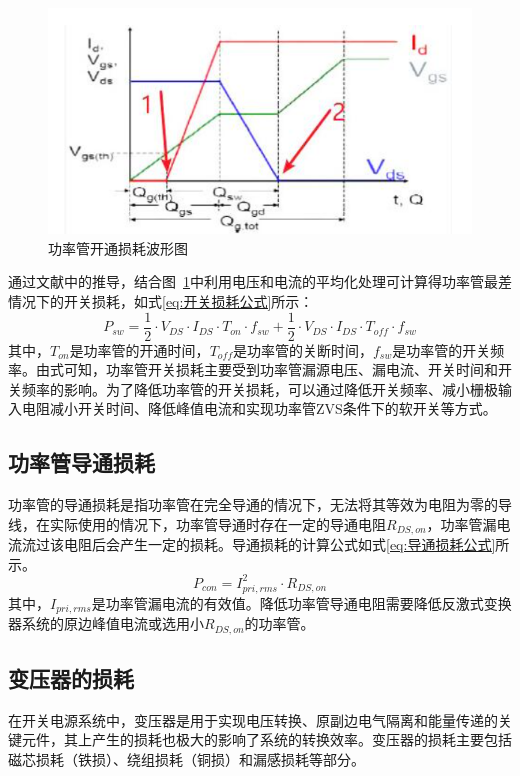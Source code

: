 \begin{figure}[htbp] 
    \centering
    \includegraphics[width=0.6\linewidth]{figures/开关损耗图.png}
    \caption{功率管开通损耗波形图}
    \label{fig:开关损耗图}
\end{figure}

通过文献中的推导，结合图~\ref{fig:开关损耗图}中利用电压和电流的平均化处理可计算得功率管最差情况下的开关损耗，如式\eqref{eq:开关损耗公式}所示：
\begin{equation}
    \label{eq:开关损耗公式}
    P_{sw}=\frac{1}{2} \cdot V_{DS} \cdot I_{DS} \cdot T_{on} \cdot f_{sw} + \frac{1}{2} \cdot V_{DS} \cdot I_{DS} \cdot T_{off} \cdot f_{sw}
\end{equation}
其中，$T_{on}$是功率管的开通时间，$T_{off}$是功率管的关断时间，$f_{sw}$是功率管的开关频率。由式可知，功率管开关损耗主要受到功率管漏源电压、漏电流、开关时间和开关频率的影响。为了降低功率管的开关损耗，可以通过降低开关频率、减小栅极输入电阻减小开关时间、降低峰值电流和实现功率管ZVS条件下的软开关等方式。

\subsection{功率管导通损耗}

功率管的导通损耗是指功率管在完全导通的情况下，无法将其等效为电阻为零的导线，在实际使用的情况下，功率管导通时存在一定的导通电阻$R_{DS,on}$，功率管漏电流流过该电阻后会产生一定的损耗。导通损耗的计算公式如式\eqref{eq:导通损耗公式}所示。
\begin{equation}
    \label{eq:导通损耗公式}
    P_{con} = I_{pri,rms}^2 \cdot R_{DS,on}
\end{equation}
其中，$I_{pri,rms}$是功率管漏电流的有效值。降低功率管导通电阻需要降低反激式变换器系统的原边峰值电流或选用小$R_{DS,on}$的功率管。

\subsection{变压器的损耗}

在开关电源系统中，变压器是用于实现电压转换、原副边电气隔离和能量传递的关键元件，其上产生的损耗也极大的影响了系统的转换效率。变压器的损耗主要包括磁芯损耗（铁损）、绕组损耗（铜损）和漏感损耗等部分。

